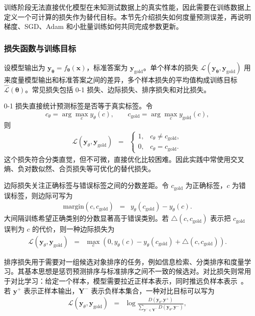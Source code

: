 训练阶段无法直接优化模型在未知测试数据上的真实性能，因此需要在训练数据上定义一个可计算的损失作为替代目标。本节先介绍损失如何度量预测误差，再说明梯度、SGD、Adam 和小批量训练如何共同完成参数更新。

\subsubsection{损失函数与训练目标}

设模型输出为 $\mathbf{y}_{\boldsymbol{\theta}}=f_{\boldsymbol{\theta}}(\mathbf{x})$，标准答案为 $\mathbf{y}_{\mathrm{gold}}$。单个样本的损失 $\mathcal{L}(\mathbf{y}_{\boldsymbol{\theta}},\mathbf{y}_{\mathrm{gold}})$ 用来度量模型输出和标准答案之间的差异，多个样本损失的平均值构成训练目标 $\hat{\mathcal{L}}(\boldsymbol{\theta})$。常见损失包括 0-1 损失、边际损失、排序损失和对比损失。

0-1 损失直接统计预测标签是否等于真实标签。令
\[
c_{\theta}=\arg\max_c y_{\theta}(c),
\qquad
c_{\mathrm{gold}}=\arg\max_c y_{\mathrm{gold}}(c),
\]
则
\begin{eqnarray}
\mathcal{L}(\mathbf{y}_{\theta},\mathbf{y}_{\mathrm{gold}})
& = &
\begin{cases}
1, & c_{\theta}\neq c_{\mathrm{gold}},\\
0, & c_{\theta}=c_{\mathrm{gold}}.
\end{cases}
\end{eqnarray}
这个损失符合分类直觉，但不可微，直接优化比较困难。因此实践中常使用交叉熵、负对数似然、合页损失等可优化的替代损失。

边际损失关注正确标签与错误标签之间的分数差距。令 $c_{\mathrm{gold}}$ 为正确标签，$c$ 为错误标签，则边际可写为
\begin{eqnarray}
\mathrm{margin}(c,c_{\mathrm{gold}})
& = &
y_{\theta}(c_{\mathrm{gold}})-y_{\theta}(c).
\end{eqnarray}
大间隔训练希望正确类别的分数显著高于错误类别。若 $\bigtriangleup(c,c_{\mathrm{gold}})$ 表示把 $c_{\mathrm{gold}}$ 误判为 $c$ 的代价，则一种边际损失为~\cite{Collobert-and-Weston:2008AUA}
\begin{eqnarray}
\mathcal{L}(\mathbf{y}_{\theta},\mathbf{y}_{\mathrm{gold}})
& = &
\max_c
\left(
0,
y_{\theta}(c)-y_{\theta}(c_{\mathrm{gold}})
+\bigtriangleup(c,c_{\mathrm{gold}})
\right).
\end{eqnarray}

排序损失用于需要对一组候选对象排序的任务，例如信息检索、分类排序和度量学习。其基本思想是惩罚预测排序与标准排序之间不一致的候选对。对比损失则常用于对比学习：给定一个样本，模型需要拉近正样本表示，同时推远负样本表示~\cite{OordEtAl2018CPC,ChenEtAl2020SimCLR}。若 $\mathbf{y}^{+}$ 表示正样本输出，$\mathbf{Y}^{-}$ 表示负样本集合，一种对比目标可以写为
\begin{eqnarray}
\mathcal{L}(\mathbf{y}_{\theta},\mathbf{y}_{\mathrm{gold}})
& = &
\log
\frac{D(\mathbf{y}_{\theta},\mathbf{y}^{+})}
{\sum_{\mathbf{y}^{-}\in \mathbf{Y}^{-}}D(\mathbf{y}_{\theta},\mathbf{y}^{-})},
\end{eqnarray}

